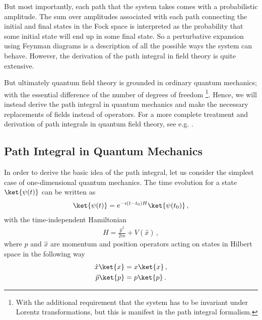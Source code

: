 But most importantly, each path that the system takes comes with a probabilistic amplitude. The sum over amplitudes associated with each path connecting the initial and final states in the Fock space is interpreted as the probability that some initial state will end up in some final state. So a perturbative expansion using Feynman diagrams is a description of all the possible ways the system can behave. However, the derivation of the path integral in field theory is quite extensive.

But ultimately quantum field theory is grounded in ordinary quantum mechanics; with the essential difference of the number of degrees of freedom \footnote{With the additional requirement that the system has to be invariant under Lorentz transformations, but this is manifest in the path integral formalism.}. Hence, we will instead derive the path integral in quantum mechanics and make the necessary replacements of fields instead of operators. For a more complete treatment and derivation of path integrals in quantum field theory, see e.g. \cite{Peskin:257493,Schwartz:2013pla}. 
 
\subsection{Path Integral in Quantum Mechanics}\label{sec:Path I in QM}
In order to derive the basic idea of the path integral, let us consider the simplest case of one-dimensional quantum mechanics. The time evolution for a state $\ket{\psi(t)}$ can be written as
\begin{align}\label{eq:time evolution of QM state}
    \ket{\psi(t)}=e^{-i(t-t_0)H}\ket{\psi(t_0)}\,,
\end{align}
with the time-independent Hamiltonian 
\begin{align}
    H=\frac{\hat{p}^{2}}{2m}+V(\hat{x})\,,
\end{align}
where $\hat{p}$ and $\hat{x}$ are momentum and position operators acting on states in Hilbert space in the following way
\begin{align}
    \hat{x}\ket{x}&=x\ket{x}\,,
    \\
    \hat{p}\ket{p}&=p\ket{p}\,.
\end{align}

